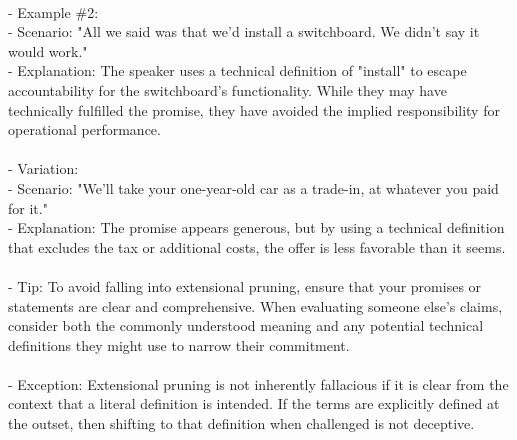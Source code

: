 \documentclass[a4paper,12pt,single,pdftex]{scrartcl}
\begin{document}
    
      
    \\

    
      - Example \#2:
    \\

    
        - Scenario: "All we said was that we’d install a switchboard. We didn’t say it would work."
    \\

    
        - Explanation: The speaker uses a technical definition of "install" to escape accountability for the switchboard’s functionality. While they may have technically fulfilled the promise, they have avoided the implied responsibility for operational performance.
    \\

    
      
    \\

    
      - Variation:
    \\

    
        - Scenario: "We’ll take your one-year-old car as a trade-in, at whatever you paid for it."
    \\

    
        - Explanation: The promise appears generous, but by using a technical definition that excludes the tax or additional costs, the offer is less favorable than it seems.
    \\

    
      
    \\

    
      - Tip: To avoid falling into extensional pruning, ensure that your promises or statements are clear and comprehensive. When evaluating someone else's claims, consider both the commonly understood meaning and any potential technical definitions they might use to narrow their commitment.
    \\

    
      
    \\

    
      - Exception: Extensional pruning is not inherently fallacious if it is clear from the context that a literal definition is intended. If the terms are explicitly defined at the outset, then shifting to that definition when challenged is not deceptive.
    \\

    
      
    \\
\end{document}
